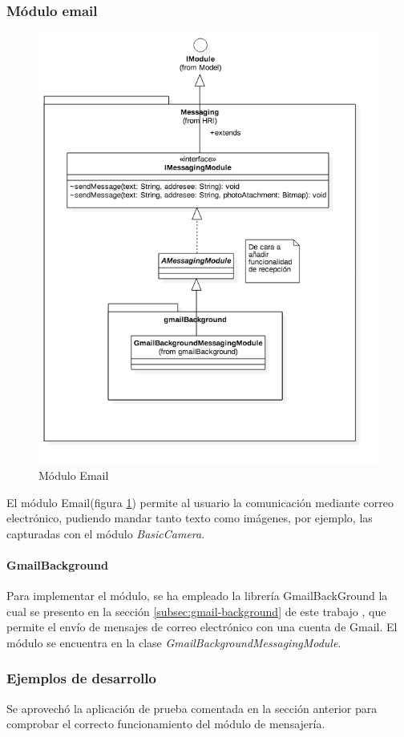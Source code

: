 \subsubsection{Módulo email}
\begin{figure}
	\centering
	\includegraphics[width=0.7\linewidth]{imagenes/diagramas/MessagingModule.png}
	\caption{Módulo Email}
	\label{fig:email-module}
\end{figure}
El módulo Email(figura \ref{fig:email-module}) permite al usuario la comunicación mediante correo electrónico, pudiendo mandar tanto texto como imágenes, por ejemplo, las capturadas con el módulo \textit{BasicCamera}.

\paragraph*{GmailBackground\\}
Para implementar el módulo, se ha empleado la librería GmailBackGround \cite{gmailbg} la cual se presento en la sección \ref{subsec:gmail-background} de este trabajo , que permite el envío de mensajes de correo electrónico con una cuenta de Gmail. El módulo se encuentra en la clase \textit{GmailBackgroundMessagingModule}.
\newpage

\subsubsection*{Ejemplos de desarrollo}

Se aprovechó la aplicación de prueba comentada en la sección anterior para comprobar el correcto funcionamiento del módulo de mensajería.








